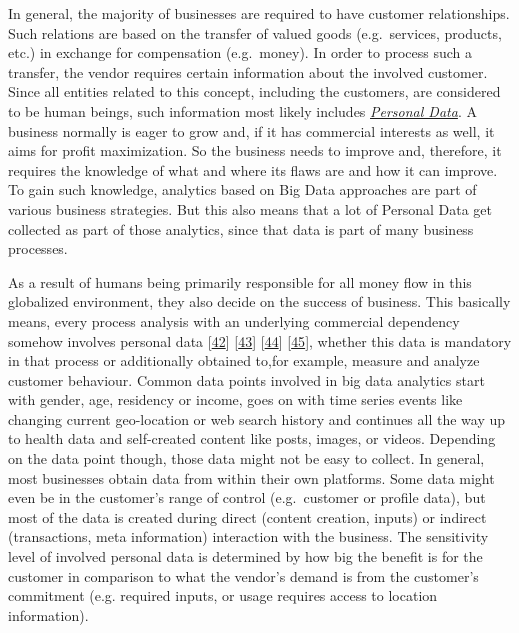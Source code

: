 \documentclass[12pt,english,a4paper,titlepage,cleardoublepage=empty,dottedtoc]{report}
\begin{document}
In general, the majority of businesses are required to have customer
relationships. Such relations are based on the transfer of valued goods
(e.g.~services, products, etc.) in exchange for compensation
(e.g.~money). In order to process such a transfer, the vendor requires
certain information about the involved customer. Since all entities
related to this concept, including the customers, are considered to be
human beings, such information most likely includes
\emph{\protect\hyperlink{digital-identity-personal-data-and-ownership}{Personal
Data}}. A business normally is eager to grow and, if it has commercial
interests as well, it aims for profit maximization. So the business
needs to improve and, therefore, it requires the knowledge of what and
where its flaws are and how it can improve. To gain such knowledge,
analytics based on Big Data approaches are part of various business
strategies. But this also means that a lot of Personal Data get
collected as part of those analytics, since that data is part of many
business processes.

As a result of humans being primarily responsible for all money flow in
this globalized environment, they also decide on the success of
business. This basically means, every process analysis with an
underlying commercial dependency somehow involves personal data
{[}\protect\hyperlink{ref-web_2016_facebook-utilizes-98-data-points}{42}{]}
{[}\protect\hyperlink{ref-web_2016_big-data-types-of-data-used-in-analytics}{43}{]}
{[}\protect\hyperlink{ref-book-chapter_1999_Principles-of-knowledge-discovery-in-databases_introduction-to-data-mining}{44}{]}
{[}\protect\hyperlink{ref-web_2013_big-data-collection-collides-with-privacy-concerns}{45}{]},
whether this data is mandatory in that process or additionally obtained
to,for example, measure and analyze customer behaviour. Common data
points involved in big data analytics start with gender, age, residency
or income, goes on with time series events like changing current
geo-location or web search history and continues all the way up to
health data and self-created content like posts, images, or videos.
Depending on the data point though, those data might not be easy to
collect. In general, most businesses obtain data from within their own
platforms. Some data might even be in the customer's range of control
(e.g.~customer or profile data), but most of the data is created during
direct (content creation, inputs) or indirect (transactions, meta
information) interaction with the business. The sensitivity level of
involved personal data is determined by how big the benefit is for the
customer in comparison to what the vendor's demand is from the
customer's commitment (e.g. required inputs, or usage requires access to
location information).
\end{document}

